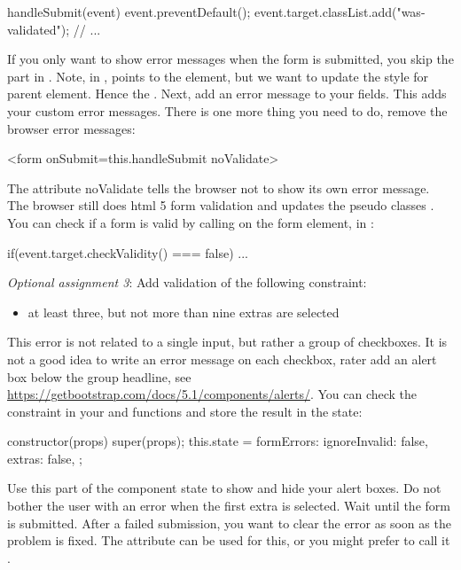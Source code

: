 \documentclass[fleqn, article, a4paper]{memoir}
\begin{document}
\begin{Assignments}
\begin{Code}
{}
handleSubmit(event){
  event.preventDefault();
  event.target.classList.add("was-validated");
  // ...
}
\end{Code}
If you only want to show error messages when the form is submitted, you skip the part in . Note, in ,  points to the  element, but we want to update the style for parent  element. Hence the . Next, add an error message to your  fields. This adds your custom error messages. There is one more thing you need to do, remove the browser error messages:
\begin{Code}
<form onSubmit={this.handleSubmit} noValidate>
\end{Code}
The attribute noValidate tells the browser not to show its own error message. The browser still does html 5 form validation and updates the pseudo classes . You can check if a form is valid by calling  on the form element, in :
\begin{Code}
if(event.target.checkValidity() === false){ ... }
\end{Code}

\item \emph{Optional assignment 3}: Add validation of the following constraint:
\begin{itemize}
  \item at least three, but not more than nine extras are selected
\end{itemize}
This error is not related to a single input, but rather a group of checkboxes. It is not a good idea to write an error message on each checkbox, rater add an alert box below the group headline, see \url{https://getbootstrap.com/docs/5.1/components/alerts/}. You can check the constraint in your  and  functions and store the result in the state:
\begin{Code}
constructor(props) {
  super(props);
  this.state = {
    formErrors: {
      ignoreInvalid: false,
      extras: false,
    }
  };
}
\end{Code}
Use this part of the component state to show and hide your alert boxes. Do not bother the user with an error when the first extra is selected. Wait until the form is submitted. After a failed submission, you want to clear the error as soon as the problem is fixed. The attribute  can be used for this, or you might prefer to call it .

\end{Assignments}


\end{document}
